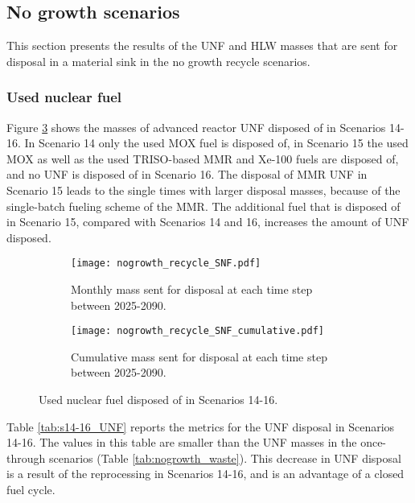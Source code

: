 \subsection{No growth scenarios}
This section presents the results of the \gls{UNF} and 
\gls{HLW} masses that are sent for disposal in a 
material sink in the no growth recycle scenarios. 

\subsubsection{Used nuclear fuel}
Figure \ref{fig:nogrowth_recycle_UNF} shows the 
masses of advanced reactor \gls{UNF} disposed of 
in Scenarios 14-16. In Scenario 14 only the used \gls{MOX} 
fuel is disposed of, in Scenario 15 the used \gls{MOX} as 
well as the used \gls{TRISO}-based \gls{MMR} and Xe-100 fuels 
are disposed of, 
and no \gls{UNF} is disposed of in Scenario 16. The disposal of 
\gls{MMR} \gls{UNF} in Scenario 15 leads to the single times 
with larger disposal masses, because of the single-batch 
fueling scheme of the \gls{MMR}. The additional fuel that 
is disposed of in Scenario 15, compared with Scenarios 
14 and 16, increases the amount of \gls{UNF} disposed. 

\begin{figure}[h!]
    \centering
    \begin{subfigure}[b]{0.49\textwidth}
        \centering
        \texttt{[image: nogrowth\_recycle\_SNF.pdf]}
        \caption{Monthly mass sent for disposal 
        at each time step between 2025-2090.}
        \label{fig:nogrowth_recycle_UNF_all}
    \end{subfigure}
    \hfill
    \begin{subfigure}[b]{0.49\textwidth}
        \centering
        \texttt{[image: nogrowth\_recycle\_SNF\_cumulative.pdf]}
        \caption{Cumulative mass sent for disposal 
        at each time step between 2025-2090.}
        \label{fig:nogrowth_recycle_UNF_cumulative}
    \end{subfigure}
       \caption{Used nuclear fuel disposed of in Scenarios 14-16.}
       \label{fig:nogrowth_recycle_UNF}
\end{figure}

Table \ref{tab:s14-16_UNF} reports the metrics for the \gls{UNF} disposal 
in Scenarios 14-16. The values in this table are smaller than 
the \gls{UNF} masses in the once-through scenarios (Table 
\ref{tab:nogrowth_waste}). This decrease in \gls{UNF} disposal is 
a result of the reprocessing in Scenarios 14-16, and is an 
advantage of a closed fuel cycle. 

